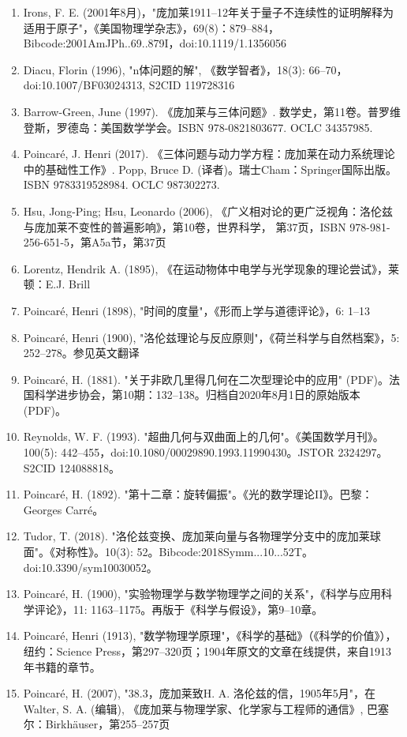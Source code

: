 \begin{enumerate}
\item Irons, F. E. (2001年8月)，"庞加莱1911–12年关于量子不连续性的证明解释为适用于原子"，《美国物理学杂志》，69(8)：879–884，Bibcode:2001AmJPh..69..879I，doi:10.1119/1.1356056  
\item Diacu, Florin (1996), "n体问题的解", 《数学智者》，18(3): 66–70，doi:10.1007/BF03024313, S2CID 119728316  
\item Barrow-Green, June (1997). 《庞加莱与三体问题》. 数学史，第11卷。普罗维登斯，罗德岛：美国数学学会。ISBN 978-0821803677. OCLC 34357985.  
\item Poincaré, J. Henri (2017). 《三体问题与动力学方程：庞加莱在动力系统理论中的基础性工作》. Popp, Bruce D. (译者)。瑞士Cham：Springer国际出版。ISBN 9783319528984. OCLC 987302273.  
\item Hsu, Jong-Ping; Hsu, Leonardo (2006), 《广义相对论的更广泛视角：洛伦兹与庞加莱不变性的普遍影响》，第10卷，世界科学， 第37页，ISBN 978-981-256-651-5，第A5a节，第37页  
\item Lorentz, Hendrik A. (1895), 《在运动物体中电学与光学现象的理论尝试》，莱顿：E.J. Brill  
\item Poincaré, Henri (1898), "时间的度量"，《形而上学与道德评论》，6: 1–13  
\item Poincaré, Henri (1900), "洛伦兹理论与反应原则"，《荷兰科学与自然档案》，5: 252–278。参见英文翻译  
\item Poincaré, H. (1881). "关于非欧几里得几何在二次型理论中的应用" (PDF)。法国科学进步协会，第10期：132–138。归档自2020年8月1日的原始版本 (PDF)。  
\item Reynolds, W. F. (1993). "超曲几何与双曲面上的几何"。《美国数学月刊》。100(5): 442–455，doi:10.1080/00029890.1993.11990430。JSTOR 2324297。S2CID 124088818。  
\item Poincaré, H. (1892). "第十二章：旋转偏振"。《光的数学理论II》。巴黎：Georges Carré。  
\item Tudor, T. (2018). "洛伦兹变换、庞加莱向量与各物理学分支中的庞加莱球面"。《对称性》。10(3): 52。Bibcode:2018Symm...10...52T。doi:10.3390/sym10030052。  
\item Poincaré, H. (1900), "实验物理学与数学物理学之间的关系"，《科学与应用科学评论》，11: 1163–1175。再版于《科学与假设》，第9–10章。  
\item Poincaré, Henri (1913), "数学物理学原理"，《科学的基础》（《科学的价值》），纽约：Science Press，第297–320页；1904年原文的文章在线提供，来自1913年书籍的章节。  
\item Poincaré, H. (2007), "38.3，庞加莱致H. A. 洛伦兹的信，1905年5月"，在Walter, S. A. (编辑), 《庞加莱与物理学家、化学家与工程师的通信》, 巴塞尔：Birkhäuser，第255–257页

\end{enumerate}
